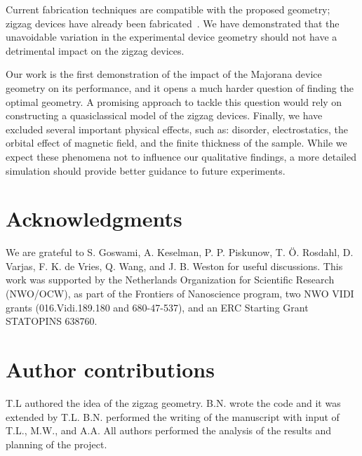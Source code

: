 \documentclass[english, twocolumn, 10pt, aps, superscriptaddress, floatfix, prb, citeautoscript]{revtex4-1}
\renewcommand{\comment}[2]{#2}
\begin{document}
\comment{Current fabrication techniques are compatible with the proposed geometry, and experimental verification can be near.}
Current fabrication techniques are compatible with the proposed geometry; zigzag devices have already been fabricated~\cite{Vries}.
We have demonstrated that the unavoidable variation in the experimental device geometry should not have a detrimental impact on the zigzag devices.

\comment{Optimizing the geometry, more detailed modeling, and a simple analytical estimation are open questions for further research}
Our work is the first demonstration of the impact of the Majorana device geometry on its performance, and it opens a much harder question of finding the optimal geometry.
A promising approach to tackle this question would rely on constructing a quasiclassical model of the zigzag devices.
Finally, we have excluded several important physical effects, such as: disorder, electrostatics, the orbital effect of magnetic field, and the finite thickness of the sample.
While we expect these phenomena not to influence our qualitative findings, a more detailed simulation should provide better guidance to future experiments.

\section{Acknowledgments}
We are grateful to  S. Goswami, A. Keselman, P. P. Piskunow, T. Ö. Rosdahl, D. Varjas, F. K. de Vries, Q. Wang, and J. B. Weston for useful discussions.
This work was supported by the Netherlands Organization for Scientific Research (NWO/OCW), as part of the Frontiers of Nanoscience program, two NWO VIDI grants (016.Vidi.189.180 and 680-47-537), and an ERC Starting Grant STATOPINS 638760.

\section{Author contributions}
T.L authored the idea of the zigzag geometry.
B.N. wrote the code and it was extended by T.L.
B.N. performed the writing of the manuscript with input of T.L., M.W., and A.A.
All authors performed the analysis of the results and planning of the project.



\end{document}
